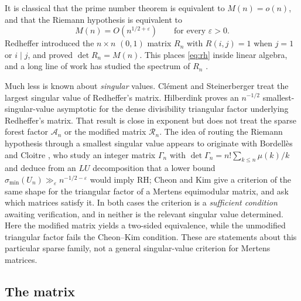 \documentclass[11pt]{article}
\theoremstyle{definition}
\theoremstyle{remark}
\newcommand{\Rc}{\mathcal{R}}
\newcommand{\Ac}{\mathcal{A}}
\begin{document}
It is classical that the prime number theorem is equivalent to $M(n)=o(n)$,
and that the Riemann hypothesis is equivalent to
\begin{equation}\label{eq:rh}
  M(n) = O(n^{1/2+\varepsilon})\qquad\text{for every }\varepsilon>0 .
\end{equation}
Redheffer \cite{redheffer} introduced the $n\times n$ $(0,1)$ matrix $R_n$ with
$R(i,j)=1$ when $j=1$ or $i\mid j$, and proved $\det R_n = M(n)$. This places
\eqref{eq:rh} inside linear algebra, and a long line of work has studied the
spectrum of $R_n$ \cite{bfp,barrettjarvis,vaughanI,vaughanII,cardon,camargo}.

Much less is known about \emph{singular} values. Cl\'ement and Steinerberger
\cite{clementsteinerberger} treat the largest singular value of Redheffer's
matrix. Hilberdink \cite[\S4(b)]{hilberdink} proves an
$n^{-1/2}$ smallest-singular-value asymptotic for the dense divisibility
triangular factor underlying Redheffer's matrix. That result is close in
exponent but does not treat the sparse forest factor $\Ac_n$ or the modified
matrix $\Rc_n$. The idea of routing the Riemann hypothesis through a smallest singular
value appears to originate with Bordell\`es and Cloitre
\cite{bordellescloitre}, who study an
integer matrix $\Gamma_n$ with $\det\Gamma_n = n!\sum_{k\le n}\mu(k)/k$ and
deduce from an $LU$ decomposition that a lower bound
$\sigma_{\min}(U_n)\gg_\varepsilon n^{-1/2-\varepsilon}$ would imply RH; Cheon
and Kim \cite{cheonkim} give a criterion of the same shape for the triangular
factor of a Mertens equimodular matrix, and ask which matrices satisfy it. In
both cases the criterion is a \emph{sufficient condition} awaiting verification,
and in neither is the relevant singular value determined. Here the modified
matrix yields a two-sided equivalence, while the unmodified triangular factor
fails the Cheon--Kim condition. These are statements about this particular
sparse family, not a general singular-value criterion for Mertens matrices.

\subsection{The matrix}
\end{document}
